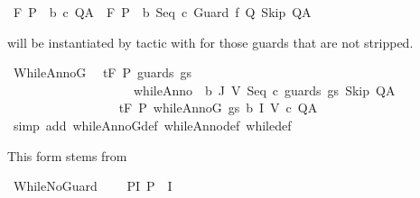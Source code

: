 \begin{isabellebody}
\ {\isachardoublequoteopen}{\isasymGamma}{\isacharcomma}{\isasymTheta}{\isasymturnstile}\isactrlbsub {\isacharslash}F\isactrlesub \ {\isacharparenleft}P\ {\isasyminter}\ b{\isacharparenright}\ c\ Q{\isacharcomma}A\ {\isasymLongrightarrow}\ {\isasymGamma}{\isacharcomma}{\isasymTheta}{\isasymturnstile}\isactrlbsub {\isacharslash}F\isactrlesub \ {\isacharparenleft}P\ {\isasyminter}\ b{\isacharparenright}\ {\isacharparenleft}Seq\ c\ {\isacharparenleft}Guard\ f\ Q\ Skip{\isacharparenright}{\isacharparenright}\ Q{\isacharcomma}A{\isachardoublequoteclose}\isanewline
%
\isadelimproof
%
\endisadelimproof
%
\isatagproof
{}\isamarkupfalse%
%
\endisatagproof
{\isafoldproof}%
%
\isadelimproof
%
\endisadelimproof
%
\begin{isamarkuptext}%
 will be instantiated by tactic with  for
  those guards that are not stripped.%
\end{isamarkuptext}\isamarkuptrue%
\isamarkupfalse%
\ WhileAnnoG{\isacharcolon}\isanewline
\ \ {\isachardoublequoteopen}{\isasymGamma}{\isacharcomma}{\isasymTheta}{\isasymturnstile}\isactrlsub t\isactrlbsub {\isacharslash}F\isactrlesub \ P\ {\isacharparenleft}guards\ gs\ \isanewline
\ \ \ \ \ \ \ \ \ \ \ \ \ \ \ \ \ \ \ \ {\isacharparenleft}whileAnno\ \ b\ J\ V\ {\isacharparenleft}Seq\ c\ {\isacharparenleft}guards\ gs\ Skip{\isacharparenright}{\isacharparenright}{\isacharparenright}{\isacharparenright}\ Q{\isacharcomma}A\ \isanewline
\ \ \ \ \ \ \ \ {\isasymLongrightarrow}\ \isanewline
\ \ \ \ \ \ \ \ {\isasymGamma}{\isacharcomma}{\isasymTheta}{\isasymturnstile}\isactrlsub t\isactrlbsub {\isacharslash}F\isactrlesub \ P\ {\isacharparenleft}whileAnnoG\ gs\ b\ I\ V\ c{\isacharparenright}\ Q{\isacharcomma}A{\isachardoublequoteclose}\isanewline
%
\isadelimproof
\ \ %
\endisadelimproof
%
\isatagproof
{}\isamarkupfalse%
\ {\isacharparenleft}simp\ add{\isacharcolon}\ whileAnnoG{\isacharunderscore}def\ whileAnno{\isacharunderscore}def\ while{\isacharunderscore}def{\isacharparenright}%
\endisatagproof
{\isafoldproof}%
%
\isadelimproof
%
\endisadelimproof
%
\begin{isamarkuptext}%
This form stems from %
\end{isamarkuptext}\isamarkuptrue%
\isamarkupfalse%
\ WhileNoGuard{\isacharprime}{\isacharcolon}\ \isanewline
\ \ \ P{\isacharunderscore}I{\isacharcolon}\ {\isachardoublequoteopen}P\ {\isasymsubseteq}\ I{\isachardoublequoteclose}\ \isanewline

\end{isabellebody}
